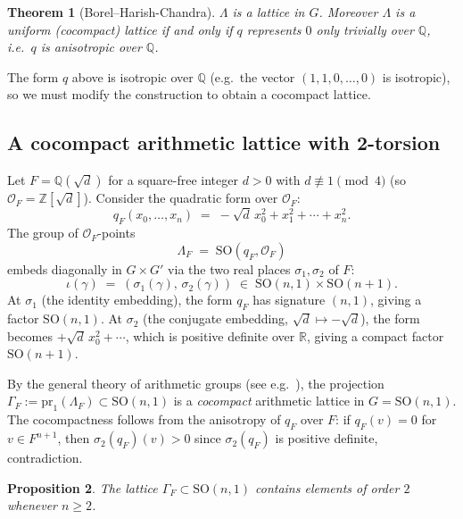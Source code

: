 \documentclass[12pt]{article}
\newtheorem{theorem}{Theorem}[section]
\newtheorem{proposition}[theorem]{Proposition}
\newcommand{\R}{\mathbb{R}}
\newcommand{\Z}{\mathbb{Z}}
\newcommand{\Q}{\mathbb{Q}}
\newcommand{\SO}{\mathrm{SO}}
\begin{document}
\begin{theorem}[Borel--Harish-Chandra]\label{thm:BHC}
$\Lambda$ is a lattice in $G$.  Moreover $\Lambda$ is a uniform (cocompact) lattice if and
only if $q$ represents $0$ only trivially over $\Q$, i.e.\ $q$ is anisotropic over $\Q$.
\end{theorem}

The form $q$ above is isotropic over $\Q$ (e.g.\ the vector $(1,1,0,\ldots,0)$ is isotropic),
so we must modify the construction to obtain a cocompact lattice.

\subsection{A cocompact arithmetic lattice with 2-torsion}
\label{ssec:cocompact}

Let $F = \Q(\sqrt{d})$ for a square-free integer $d > 0$ with $d \not\equiv 1 \pmod{4}$ (so
$\mathcal{O}_F = \Z[\sqrt{d}]$).  Consider the quadratic form over $\mathcal{O}_F$:
\[
  q_F(x_0, \ldots, x_n) \;=\; -\sqrt{d}\,x_0^2 + x_1^2 + \cdots + x_n^2.
\]
The group of $\mathcal{O}_F$-points
\[
  \Lambda_F \;=\; \SO(q_F, \mathcal{O}_F)
\]
embeds diagonally in $G \times G'$ via the two real places $\sigma_1, \sigma_2$ of $F$:
\[
  \iota(\gamma) \;=\; (\sigma_1(\gamma),\, \sigma_2(\gamma))
  \;\in\; \SO(n,1) \times \SO(n+1).
\]
At $\sigma_1$ (the identity embedding), the form $q_F$ has signature $(n,1)$, giving a factor
$\SO(n,1)$.  At $\sigma_2$ (the conjugate embedding, $\sqrt{d}\mapsto -\sqrt{d}$), the form
becomes $+\sqrt{d}\,x_0^2 + \cdots$, which is positive definite over $\R$, giving a compact
factor $\SO(n+1)$.

By the general theory of arithmetic groups (see e.g.\ \cite{BorelHarishChandra62,
Witte2015}), the projection $\Gamma_F := \mathrm{pr}_1(\Lambda_F) \subset \SO(n,1)$ is a
\emph{cocompact} arithmetic lattice in $G = \SO(n,1)$.  The cocompactness follows from the
anisotropy of $q_F$ over $F$: if $q_F(v) = 0$ for $v \in F^{n+1}$, then $\sigma_2(q_F)(v) > 0$
since $\sigma_2(q_F)$ is positive definite, contradiction.

\begin{proposition}\label{prop:torsion}
The lattice $\Gamma_F \subset \SO(n,1)$ contains elements of order $2$ whenever $n \geq 2$.
\end{proposition}
\end{document}
